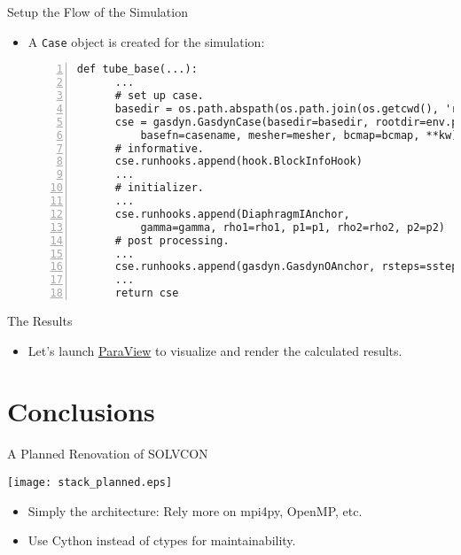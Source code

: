 \documentclass[dvips,xcolor=pst,14pt]{beamer}
\begin{document}
\begin{frame}[fragile]{
%
Setup the Flow of the Simulation
%
}
\begin{itemize} \small
  \item A \texttt{Case} object is created for the simulation:
  \begin{Verbatim}[frame=single,numbers=left,fontsize=\scriptsize]
  def tube_base(...):
      ...
      # set up case.
      basedir = os.path.abspath(os.path.join(os.getcwd(), 'result'))
      cse = gasdyn.GasdynCase(basedir=basedir, rootdir=env.projdir,
          basefn=casename, mesher=mesher, bcmap=bcmap, **kw)
      # informative.
      cse.runhooks.append(hook.BlockInfoHook)
      ...
      # initializer.
      ...
      cse.runhooks.append(DiaphragmIAnchor,
          gamma=gamma, rho1=rho1, p1=p1, rho2=rho2, p2=p2)
      # post processing.
      ...
      cse.runhooks.append(gasdyn.GasdynOAnchor, rsteps=ssteps)
      ...
      return cse
  \end{Verbatim}
\end{itemize}
\end{frame}

\begin{frame}[fragile]{
%
The Results
%
}
\begin{itemize} 
  \item Let's launch \href{http://paraview.org/}{ParaView} to visualize and
  render the calculated results.
\end{itemize}
\end{frame}

\section{
Conclusions
}

\begin{frame}{
%
A Planned Renovation of SOLVCON
%
}
\begin{center}
  \parbox{\textwidth}{\centering
  \texttt{[image: stack\_planned.eps]}}
\end{center}
\begin{itemize} \footnotesize
  \item Simply the architecture: Rely more on mpi4py, OpenMP, etc.
  \item Use Cython instead of ctypes for maintainability.
\end{itemize}
\end{frame}
\end{document}

